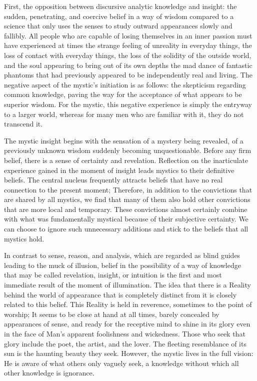 \documentclass[a4paper,12pt]{book}[2004/02/16]
\theoremstyle{ilemma}
\theoremstyle{itheorem}
\theoremstyle{iother}
\theoremstyle{icorollary}
\theoremstyle{numcorollary}
\theoremstyle{idefinition}
\begin{document}
First, the opposition between discursive analytic knowledge and insight: the sudden, penetrating, and coercive belief in a way of wisdom compared to a science that only uses the senses to study outward appearances slowly and fallibly. All people who are capable of losing themselves in an inner passion must have experienced at times the strange feeling of unreality in everyday things, the loss of contact with everyday things, the loss of the solidity of the outside world, and the soul appearing to bring out of its own depths the mad dance of fantastic phantoms that had previously appeared to be independently real and living. The negative aspect of the mystic's initiation is as follows: the skepticism regarding common knowledge, paving the way for the acceptance of what appears to be superior wisdom. For the mystic, this negative experience is simply the entryway to a larger world, whereas for many men who are familiar with it, they do not transcend it.

The mystic insight begins with the sensation of a mystery being revealed, of a previously unknown wisdom suddenly becoming unquestionable. Before any firm belief, there is a sense of certainty and revelation. Reflection on the inarticulate experience gained in the moment of insight leads mystics to their definitive beliefs. The central nucleus frequently attracts beliefs that have no real connection to the present moment;
Therefore, in addition to the convictions that are shared by all mystics, we find that many of them also hold other convictions that are more local and temporary. These convictions almost certainly combine with what was fundamentally mystical because of their subjective certainty. We can choose to ignore such unnecessary additions and stick to the beliefs that all mystics hold.

In contrast to sense, reason, and analysis, which are regarded as blind guides leading to the muck of illusion, belief in the possibility of a way of knowledge that may be called revelation, insight, or intuition is the first and most immediate result of the moment of illumination. The idea that there is a Reality behind the world of appearance that is completely distinct from it is closely related to this belief.
This Reality is held in reverence, sometimes to the point of worship; It seems to be close at hand at all times, barely concealed by appearances of sense, and ready for the receptive mind to shine in its glory even in the face of Man's apparent foolishness and wickedness.
Those who seek that glory include the poet, the artist, and the lover. The fleeting resemblance of its sun is the haunting beauty they seek.
However, the mystic lives in the full vision: He is aware of what others only vaguely seek, a knowledge without which all other knowledge is ignorance.
\end{document}
